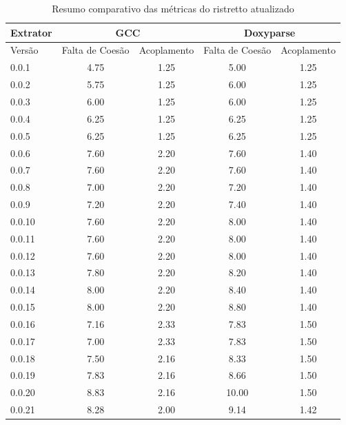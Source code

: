 \begin{table}
\caption{Resumo comparativo das métricas do ristretto atualizado}
\centering
\begin{tabular}{| l | c c | c c |}
\hline
Extrator  & \multicolumn{2}{|c|}{GCC}        & \multicolumn{2}{|c|}{Doxyparse} \\
\hline
Versão    & Falta de Coesão & Acoplamento    & Falta de Coesão & Acoplamento   \\
\hline
0.0.1     & 4.75            & 1.25           & 5.00            & 1.25          \\
0.0.2     & 5.75            & 1.25           & 6.00            & 1.25          \\
0.0.3     & 6.00            & 1.25           & 6.00            & 1.25          \\
0.0.4     & 6.25            & 1.25           & 6.25            & 1.25          \\
0.0.5     & 6.25            & 1.25           & 6.25            & 1.25          \\
0.0.6     & 7.60            & 2.20           & 7.60            & 1.40          \\
0.0.7     & 7.60            & 2.20           & 7.60            & 1.40          \\
0.0.8     & 7.00            & 2.20           & 7.20            & 1.40          \\
0.0.9     & 7.20            & 2.20           & 7.40            & 1.40          \\
0.0.10    & 7.60            & 2.20           & 8.00            & 1.40          \\
0.0.11    & 7.60            & 2.20           & 8.00            & 1.40          \\
0.0.12    & 7.60            & 2.20           & 8.00            & 1.40          \\
0.0.13    & 7.80            & 2.20           & 8.20            & 1.40          \\
0.0.14    & 8.00            & 2.20           & 8.40            & 1.40          \\
0.0.15    & 8.00            & 2.20           & 8.80            & 1.40          \\
0.0.16    & 7.16            & 2.33           & 7.83            & 1.50          \\
0.0.17    & 7.00            & 2.33           & 7.83            & 1.50          \\
0.0.18    & 7.50            & 2.16           & 8.33            & 1.50          \\
0.0.19    & 7.83            & 2.16           & 8.66            & 1.50          \\
0.0.20    & 8.83            & 2.16           & 10.00           & 1.50          \\
0.0.21    & 8.28            & 2.00           & 9.14            & 1.42          \\
\hline
\end{tabular}
\label{tab:comparacao-metricas-atualizada}
\end{table}
